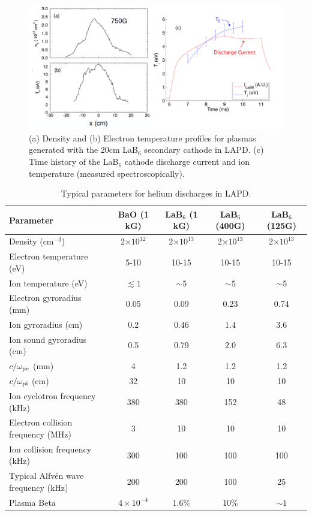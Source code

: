 \documentclass[11pt]{article}
\begin{document}
\begin{figure}[!htbp]
\centerline{\includegraphics[width=6.0truein]{lab6}}
\caption{\small (a) Density and (b) Electron temperature profiles for plasmas
generated with the 20cm LaB$_6$ secondary cathode in LAPD. (c) Time
history of the LaB$_6$ cathode discharge current and ion temperature
(measured spectroscopically).}\label{lab6}
\end{figure}

\begin{table}[!htbp]
{\begin{tabular}{|p{}|c|c|c|c|}
\hline \hline
Parameter & BaO (1 kG) & LaB$_6$ (1 kG) & LaB$_6$ (400G) & LaB$_6$ (125G) \\ \hline
\hline
Density (cm$^{-3}$) & 2$\times 10^{12}$ & 2$\times 10^{13}$ & 2$\times 10^{13}$ & 2$\times 10^{13}$ \\\hline
Electron temperature (eV) & 5-10 & 10-15 & 10-15 & 10-15 \\\hline
Ion temperature (eV) & $\lesssim 1$ & $\sim 5$ & $\sim 5$ & $\sim 5$ \\\hline
Electron gyroradius (mm) & 0.05 & 0.09 & 0.23 & 0.74 \\\hline
Ion gyroradius (cm) & 0.2 & 0.46 & 1.4  &  3.6 \\\hline
Ion sound gyroradius (cm) & 0.5 & 0.79 & 2.0 & 6.3 \\\hline
$c/\omega_{\rm pe}$ (mm) & 4 & 1.2 & 1.2 & 1.2 \\\hline
$c/\omega_{\rm pi}$ (cm) & 32 & 10 & 10 & 10 \\\hline
Ion cyclotron frequency (kHz) & 380 & 380 & 152 & 48 \\\hline
Electron collision frequency (MHz) & 3 &  10 & 10 & 10 \\\hline
Ion collision frequency (kHz)  &  300 & 100 & 100 & 100 \\\hline
Typical Alfv\'{e}n wave frequency (kHz) & 200 & 200 & 100 & 25 \\\hline
Plasma Beta  & $4\times 10^{-4}$ & 1.6\% & 10\% & $\sim 1$ \\\hline
\hline
\end{tabular}}
\caption{\small Typical parameters for helium discharges in
  LAPD. }\label{lapdparams}
\end{table}
\end{document}
